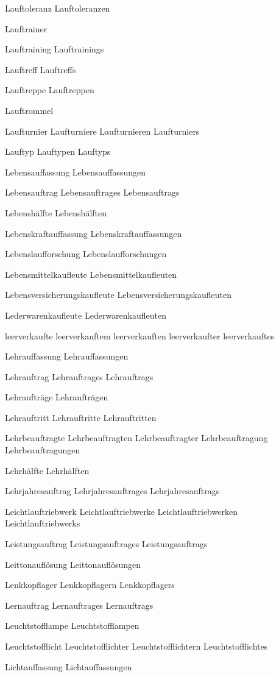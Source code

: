 Lauftoleranz
Lauftoleranzen

Lauftrainer

Lauftraining
Lauftrainings

Lauftreff
Lauftreffs

Lauftreppe
Lauftreppen

Lauftrommel

Laufturnier
Laufturniere
Laufturnieren
Laufturniers

Lauftyp
Lauftypen
Lauftyps

Lebensauffassung
Lebensauffassungen

Lebensauftrag
Lebensauftrages
Lebensauftrags

Lebenshälfte
Lebenshälften

Lebenskraftauffassung
Lebenskraftauffassungen

Lebenslaufforschung
Lebenslaufforschungen

Lebensmittelkaufleute
Lebensmittelkaufleuten

Lebensversicherungskaufleute
Lebensversicherungskaufleuten

Lederwarenkaufleute
Lederwarenkaufleuten

leerverkaufte
leerverkauftem
leerverkauften
leerverkaufter
leerverkauftes

Lehrauffassung
Lehrauffassungen

Lehrauftrag
Lehrauftrages
Lehrauftrags

Lehraufträge
Lehraufträgen

Lehrauftritt
Lehrauftritte
Lehrauftritten

Lehrbeauftragte
Lehrbeauftragten
Lehrbeauftragter
Lehrbeauftragung
Lehrbeauftragungen

Lehrhälfte
Lehrhälften

Lehrjahresauftrag
Lehrjahresauftrages
Lehrjahresauftrags

Leichtlauftriebwerk
Leichtlauftriebwerke
Leichtlauftriebwerken
Leichtlauftriebwerks

Leistungsauftrag
Leistungsauftrages
Leistungsauftrags

Leittonauflösung
Leittonauflösungen

Lenkkopflager
Lenkkopflagern
Lenkkopflagers

Lernauftrag
Lernauftrages
Lernauftrags

Leuchtstofflampe
Leuchtstofflampen

Leuchtstofflicht
Leuchtstofflichter
Leuchtstofflichtern
Leuchtstofflichtes

Lichtauffassung
Lichtauffassungen

